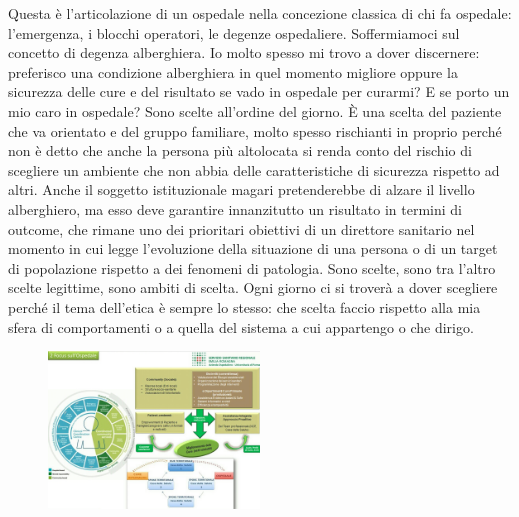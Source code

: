Questa è l'articolazione di un ospedale nella concezione classica di chi
fa ospedale: l'emergenza, i blocchi operatori, le degenze ospedaliere.
Soffermiamoci sul concetto di degenza alberghiera. Io molto spesso mi
trovo a dover discernere: preferisco una condizione alberghiera in quel
momento migliore oppure la sicurezza delle cure e del risultato se vado
in ospedale per curarmi? E se porto un mio caro in ospedale? Sono scelte
all'ordine del giorno. È una scelta del paziente che va orientato e del
gruppo familiare, molto spesso rischianti in proprio perché non è detto
che anche la persona più altolocata si renda conto del rischio di
scegliere un ambiente che non abbia delle caratteristiche di sicurezza
rispetto ad altri. Anche il soggetto istituzionale magari pretenderebbe
di alzare il livello alberghiero, ma esso deve garantire innanzitutto un
risultato in termini di outcome, che rimane uno dei prioritari obiettivi
di un direttore sanitario nel momento in cui legge l'evoluzione della
situazione di una persona o di un target di popolazione rispetto a dei
fenomeni di patologia. Sono scelte, sono tra l'altro scelte legittime,
sono ambiti di scelta. Ogni giorno ci si troverà a dover scegliere
perché il tema dell'etica è sempre lo stesso: che scelta faccio rispetto
alla mia sfera di comportamenti o a quella del sistema a cui appartengo
o che dirigo.

 \begin{figure}[!ht]
\centering
	\includegraphics[width=0.5\textwidth]{32/image11.jpeg}
	\end{figure}

